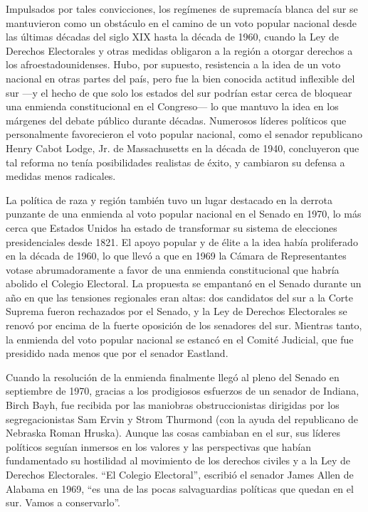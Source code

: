 Impulsados por tales convicciones, los regímenes de supremacía blanca
del sur se mantuvieron como un obstáculo en el camino de un voto popular
nacional desde las últimas décadas del siglo XIX hasta la década de
1960, cuando la Ley de Derechos Electorales y otras medidas obligaron a
la región a otorgar derechos a los afroestadounidenses. Hubo, por
supuesto, resistencia a la idea de un voto nacional en otras partes del
país, pero fue la bien conocida actitud inflexible del sur ---y el hecho
de que solo los estados del sur podrían estar cerca de bloquear una
enmienda constitucional en el Congreso--- lo que mantuvo la idea en los
márgenes del debate público durante décadas. Numerosos líderes políticos
que personalmente favorecieron el voto popular nacional, como el senador
republicano Henry Cabot Lodge, Jr. de Massachusetts en la década de
1940, concluyeron que tal reforma no tenía posibilidades realistas de
éxito, y cambiaron su defensa a medidas menos radicales.

La política de raza y región también tuvo un lugar destacado en la
derrota punzante de una enmienda al voto popular nacional en el Senado
en 1970, lo más cerca que Estados Unidos ha estado de transformar su
sistema de elecciones presidenciales desde 1821. El apoyo popular y de
élite a la idea había proliferado en la década de 1960, lo que llevó a
que en 1969 la Cámara de Representantes votase abrumadoramente a favor
de una enmienda constitucional que habría abolido el Colegio Electoral.
La propuesta se empantanó en el Senado durante un año en que las
tensiones regionales eran altas: dos candidatos del sur a la Corte
Suprema fueron rechazados por el Senado, y la Ley de Derechos
Electorales se renovó por encima de la fuerte oposición de los senadores
del sur. Mientras tanto, la enmienda del voto popular nacional se
estancó en el Comité Judicial, que fue presidido nada menos que por el
senador Eastland.

Cuando la resolución de la enmienda finalmente llegó al pleno del Senado
en septiembre de 1970, gracias a los prodigiosos esfuerzos de un senador
de Indiana, Birch Bayh, fue recibida por las maniobras obstruccionistas
dirigidas por los segregacionistas Sam Ervin y Strom Thurmond (con la
ayuda del republicano de Nebraska Roman Hruska). Aunque las cosas
cambiaban en el sur, sus líderes políticos seguían inmersos en los
valores y las perspectivas que habían fundamentado su hostilidad al
movimiento de los derechos civiles y a la Ley de Derechos Electorales.
``El Colegio Electoral'', escribió el senador James Allen de Alabama en
1969, ``es una de las pocas salvaguardias políticas que quedan en el
sur. Vamos a conservarlo''.

